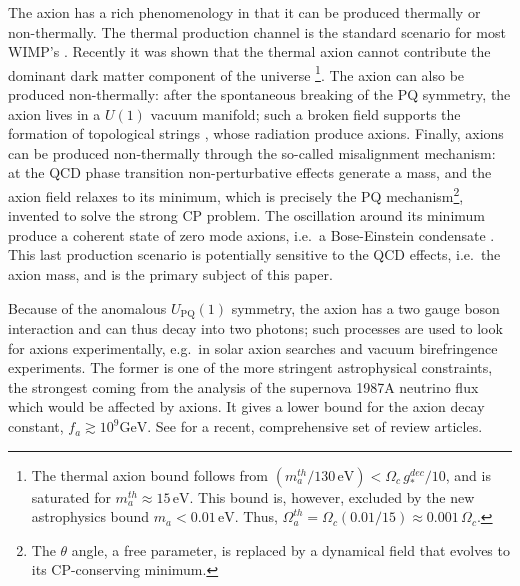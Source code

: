 \documentclass[preprint,nofootinbib]{revtex4}
\newcommand{\units}[1]{\, \mathrm{#1}}
\begin{document}
The axion has a rich phenomenology in that it can be produced thermally or non-thermally. The thermal production channel is the standard scenario for most WIMP's \cite{turner:kolb:cosmology}. Recently it was shown that the thermal axion cannot contribute the dominant dark matter component of the universe \cite{hannestad:mirizzi:raffelt:thermal:axion}\footnote{The thermal axion bound follows from $(m_a^{th}/130\units{eV}) < \Omega_c\, g^{dec}_{*}/10$, and is saturated for $m_a^{th} \approx 15 \units{eV}$. This bound is, however, excluded by the new astrophysics bound $m_a<0.01\units{eV}$. Thus, $\Omega_a^{th}=\Omega_c(0.01/15)\approx 0.001 \,\Omega_c$.}. The axion can also be produced non-thermally: after the spontaneous breaking of the PQ symmetry, the axion lives in a $U(1)$ vacuum manifold; such a broken field supports the formation of topological strings \cite{davis:axion:string:1985,davis:axion:string:1986,davis:shellard:axion:string,dabholkar:quashnock:axion:string,battye:shellard:axion:string:1994b} \cite{harari:sikivie:axion:string,hagmann:sikivie:axion:string,hagmann:chang:sikivie:axion:string}, whose radiation produce axions. Finally, axions can be produced non-thermally through the so-called misalignment mechanism: at the QCD phase transition non-perturbative effects generate a mass, and the axion field relaxes to its minimum, which is precisely the PQ mechanism\footnote{The $\theta$ angle, a free parameter, is replaced by a dynamical field that evolves to its CP-conserving minimum.}, invented to solve the strong CP problem. The oscillation around its minimum produce a coherent state of zero mode axions, i.e.\ a Bose-Einstein condensate \cite{sikivie:yang:axion}. This last production scenario is potentially sensitive to the QCD effects, i.e.\ the axion mass, and is the primary subject of this paper.

Because of the anomalous $U_\mathrm{PQ}(1)$ symmetry, the axion has a two gauge boson interaction and can thus decay into two photons; such processes are used to look for axions experimentally, e.g.\ in solar axion searches and vacuum birefringence experiments. The former is one of the more stringent astrophysical constraints, the strongest coming from the analysis of the supernova 1987A neutrino flux which would be affected by axions. It gives a lower bound for the axion decay constant, $f_a \gtrsim 10^9 \mathrm{GeV}$. See \cite{kuster:raffelt:beltran:axions} for a recent, comprehensive set of review articles.
\end{document}
